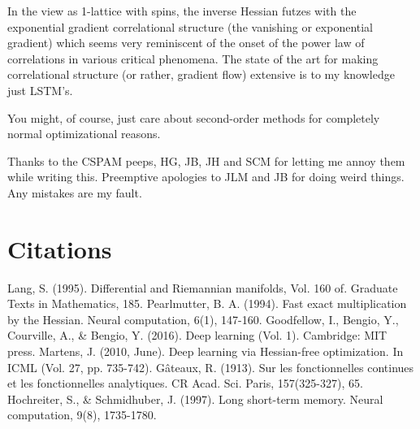 \documentclass{article}
\begin{document}
In the view as 1-lattice with spins, the inverse Hessian futzes with the exponential gradient correlational structure (the vanishing or exponential gradient) which seems very reminiscent of the onset of the power law of correlations in various critical phenomena. The state of the art for making correlational structure (or rather, gradient flow) extensive is to my knowledge just LSTM's\cite{lstm}.

You might, of course, just care about second-order methods for completely normal optimizational reasons.

Thanks to the CSPAM peeps, HG, JB, JH and SCM for letting me annoy them while writing this. Preemptive apologies to JLM and JB for doing weird things. Any mistakes are my fault.

\section{Citations}

\begin{thebibliography}{9}
Lang, S. (1995). Differential and Riemannian manifolds, Vol. 160 of. Graduate Texts in Mathematics, 185.
Pearlmutter, B. A. (1994). Fast exact multiplication by the Hessian. Neural computation, 6(1), 147-160.
Goodfellow, I., Bengio, Y., Courville, A., \& Bengio, Y. (2016). Deep learning (Vol. 1). Cambridge: MIT press.
Martens, J. (2010, June). Deep learning via Hessian-free optimization. In ICML (Vol. 27, pp. 735-742).
G\^{a}teaux, R. (1913). Sur les fonctionnelles continues et les fonctionnelles analytiques. CR Acad. Sci. Paris, 157(325-327), 65.
Hochreiter, S., \& Schmidhuber, J. (1997). Long short-term memory. Neural computation, 9(8), 1735-1780.
\end{thebibliography}
\end{document}
